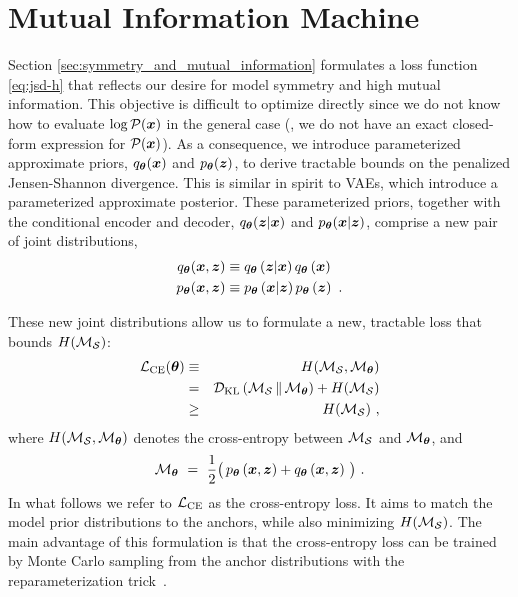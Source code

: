 
\section{Mutual Information Machine}
\label{sec:mim}

Section \ref{sec:symmetry_and_mutual_information} formulates a loss function
\eqref{eq:jsd-h} that reflects our desire for model symmetry and high mutual information.
This objective is difficult to optimize directly since we do not know how to evaluate 
$\log\mathcal{P}({\boldsymbol{x}})$ in the general case (\ie, we do not have an exact closed-form 
expression for $\mathcal{P}({\boldsymbol{x}})$).
As a consequence, we introduce parameterized approximate priors, $q_{{\boldsymbol \theta}}({\boldsymbol{x}})$ and $p_{{\boldsymbol \theta}}({\boldsymbol z})$,
to derive tractable bounds on the penalized Jensen-Shannon divergence.
This is similar in spirit to VAEs, which introduce a parameterized approximate posterior.
These parameterized priors, together with the conditional encoder and decoder,
$q_{{\boldsymbol \theta}}({\boldsymbol z} | {\boldsymbol{x}})$ and $p_{{\boldsymbol \theta}}({\boldsymbol{x}} | {\boldsymbol z})$, comprise a new pair of joint distributions,
\begin{align*}
    q_{{\boldsymbol \theta}} ({\boldsymbol{x}}, {\boldsymbol z} ) & \equiv q_{{\boldsymbol \theta}}\left({\boldsymbol z}| {\boldsymbol{x}}\right) q_{{\boldsymbol \theta}}\left({\boldsymbol{x}}\right) \\
    p_{{\boldsymbol \theta}} ({\boldsymbol{x}}, {\boldsymbol z} ) & \equiv p_{{\boldsymbol \theta}}\left({\boldsymbol{x}}| {\boldsymbol z}\right) p_{{\boldsymbol \theta}}\left({\boldsymbol z}\right)  ~.
\end{align*}

These new joint distributions allow us to formulate a new, tractable loss
that bounds $H(\mathcal{M}_{\mathcal{S}})$:
\begin{eqnarray}
    \mathcal{L}_\text{CE}({\boldsymbol \theta})
    &\equiv& H(\mathcal{M}_{\mathcal{S}}, \mathcal{M}_{{\boldsymbol \theta}})   \nonumber \\
    &=&  \mathcal{D}_\text{KL}\left(\mathcal{M}_{\mathcal{S}}\,\|\, \mathcal{M}_{{\boldsymbol \theta}}\right) + H(\mathcal{M}_{\mathcal{S}}) \nonumber \\
    &\geq&  H(\mathcal{M}_{\mathcal{S}}) ~,
    \label{eq:LCE}
\end{eqnarray}
where $H(\mathcal{M}_{\mathcal{S}}, \mathcal{M}_{{\boldsymbol \theta}})$ denotes the cross-entropy between $\mathcal{M}_{\mathcal{S}}$ and $\mathcal{M}_{{\boldsymbol \theta}}$,
and
\begin{equation}
    \mathcal{M}_{{\boldsymbol \theta}} ~= ~ \frac{1}{2} \big( \, p_{{\boldsymbol \theta}} \left({\boldsymbol{x}}, {\boldsymbol z} \right) + q_{{\boldsymbol \theta}} \left({\boldsymbol{x}}, {\boldsymbol z} \right) \, \big) ~.
\end{equation}
In what follows we refer to $\mathcal{L}_\text{CE}$ as the cross-entropy loss.
It aims to match the model prior distributions to the anchors, while also
minimizing $H(\mathcal{M}_{\mathcal{S}})$. The main advantage of this formulation is that the
cross-entropy loss can be trained by Monte Carlo sampling from the anchor
distributions with the reparameterization trick~\citep{Kingma2013, Rezende2014}.

